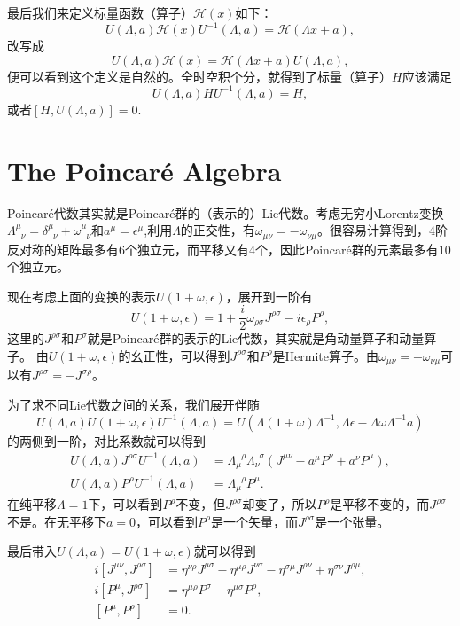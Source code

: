 最后我们来定义标量函数（算子）$\mathscr{H}(x)$如下：
\[
	U(\Lambda,a)\mathscr{H}(x) U^{-1}(\Lambda,a)=\mathscr{H}(\Lambda x+a),
\]
改写成
\[
	U(\Lambda,a)\mathscr{H}(x) =\mathscr{H}(\Lambda x+a)U(\Lambda,a),
\]
便可以看到这个定义是自然的。全时空积个分，就得到了标量（算子）$H$应该满足
\[
	U(\Lambda,a)H U^{-1}(\Lambda,a)=H,
\]
或者$[H,U(\Lambda,a)]=0$.

\section{The Poincar\'{e} Algebra}
Poincar\'{e}代数其实就是Poincar\'{e}群的（表示的）Lie代数。考虑无穷小Lorentz变换$\Lambda^\mu_{\phantom{\mu}\nu}=\delta^\mu_{\phantom{\mu}\nu}+\omega^{\mu}_{\phantom{\mu}\nu}$和$a^{\mu}=\epsilon^\mu$,利用$\Lambda$的正交性，有$\omega_{\mu\nu}=-\omega_{\nu\mu}$。很容易计算得到，4阶反对称的矩阵最多有6个独立元，而平移又有4个，因此Poincar\'{e}群的元素最多有10个独立元。

现在考虑上面的变换的表示$U(1+\omega,\epsilon)$，展开到一阶有
\[
U(1+\omega,\epsilon)=1+\frac{i}{2}\omega_{\rho\sigma}J^{\rho\sigma}-i\epsilon_\rho P^\rho,
\]
这里的$J^{\rho\sigma}$和$P^\sigma$就是Poincar\'{e}群的表示的Lie代数，其实就是角动量算子和动量算子。
由$U(1+\omega,\epsilon)$的幺正性，可以得到$J^{\rho\sigma}$和$P^\rho$是Hermite算子。由$\omega_{\mu\nu}=-\omega_{\nu\mu}$可以有$J^{\rho\sigma}=-J^{\sigma\rho}$。

为了求不同Lie代数之间的关系，我们展开伴随
\[
U(\Lambda,a)U(1+\omega,\epsilon)U^{-1}(\Lambda,a)=U(\Lambda(1+\omega)\Lambda^{-1},\Lambda\epsilon-\Lambda\omega\Lambda^{-1}a)
\]
的两侧到一阶，对比系数就可以得到
\[
\begin{split}
U(\Lambda,a)J^{\rho\sigma}U^{-1}(\Lambda,a)&=\Lambda_{\mu}^{\phantom{\mu}\rho}\Lambda_{\nu}^{\phantom{\nu}\sigma}
(J^{\mu\nu}-a^\mu P^\nu+a^\nu P^\mu),\\
U(\Lambda,a)P^{\rho}U^{-1}(\Lambda,a)&=\Lambda_{\mu}^{\phantom{\mu}\rho}P^\mu.
\end{split}
\]
在纯平移$\Lambda=1$下，可以看到$P^{\rho}$不变，但$J^{\rho\sigma}$却变了，所以$P^{\rho}$是平移不变的，而$J^{\rho\sigma}$不是。在无平移下$a=0$，可以看到$P^{\rho}$是一个矢量，而$J^{\rho\sigma}$是一个张量。

最后带入$U(\Lambda,a)=U(1+\omega,\epsilon)$就可以得到
\[
\begin{split}
	i\left[J^{\mu\nu},J^{\rho \sigma}\right]&=
	\eta^{\nu\rho}J^{\mu \sigma}-
	\eta^{\mu \rho}J^{\nu \sigma}-
	\eta^{\sigma\mu}J^{\rho \nu}+
	\eta^{\sigma\nu}J^{\rho \mu},\\
	i[P^\mu,J^{\rho\sigma}]&=\eta^{\mu \rho}P^\sigma-\eta^{\mu\sigma}P^{\rho},\\
	[P^\mu,P^\rho]&=0.
\end{split}
\]

